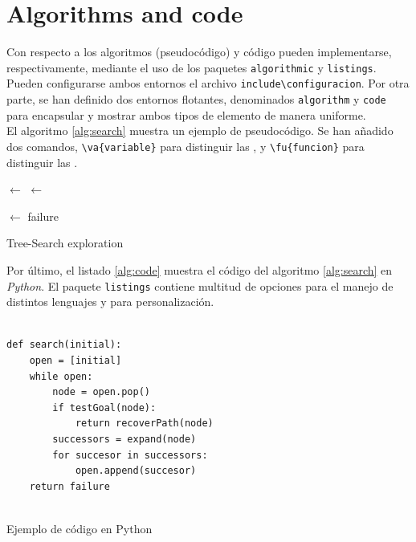 \section{Algorithms and code}

Con respecto a los algoritmos (pseudocódigo) y código pueden implementarse, respectivamente, mediante el uso de los paquetes \verb+algorithmic+ y \verb+listings+. Pueden configurarse ambos entornos el archivo \verb+include\configuracion+. Por otra parte, se han definido dos entornos flotantes, denominados \verb+algorithm+ y \verb+code+ para encapsular y mostrar ambos tipos de elemento de manera uniforme.\\


El algoritmo \ref{alg:search} muestra un ejemplo de pseudocódigo. Se han añadido dos comandos, \verb+\va{variable}+ para distinguir las , y \verb+\fu{funcion}+ para distinguir las . \\



\begin{algorithm}[b]
\begin{algorithmic}[1]
 	\State {} $\leftarrow$  
		\State {} $\leftarrow$ 
			\State \Return {} 
		\EndIf		
				
		\State {} $\leftarrow$ 
		 
			\State  {}
		\EndFor	
	\EndWhile
	\State \Return failure 
 	\EndFunction
\end{algorithmic}
\caption{Tree-Search exploration}
\label{alg:search}
\end{algorithm}

Por último, el listado \ref{alg:code} muestra el código del algoritmo \ref{alg:search} en \textit{Python}. El paquete \verb+listings+  contiene multitud de opciones para el manejo de distintos lenguajes y para personalización.

\begin{code}
\begin{lstlisting}

def search(initial):
	open = [initial]
	while open:
		node = open.pop()
		if testGoal(node):
			return recoverPath(node)
		successors = expand(node)
		for succesor in successors:
			open.append(succesor)
	return failure
		
\end{lstlisting}
\caption{Ejemplo de código en Python}
\label{alg:code}
\end{code}


